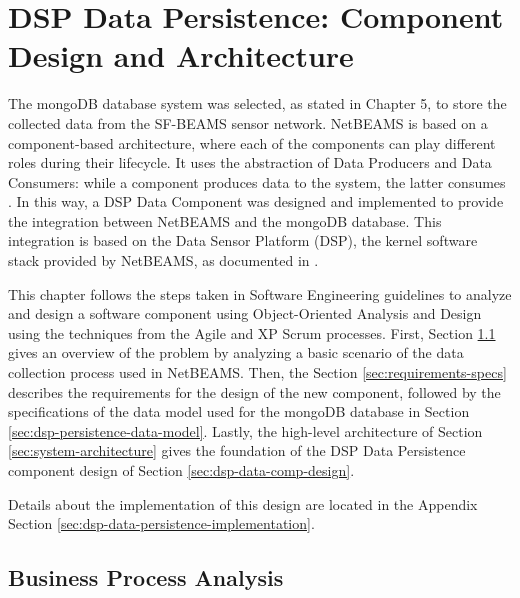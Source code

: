 

\chapter{DSP Data Persistence: Component Design and Architecture}

The mongoDB database system was selected, as stated in Chapter 5, to store 
the collected data from the SF-BEAMS sensor network. NetBEAMS is based on a 
component-based architecture, where each of the components can play different
roles during their lifecycle. It uses the abstraction of Data Producers and 
Data Consumers: while a component produces data to the system, the latter 
consumes \cite{netbeams2009}. In this way, a DSP Data Component was designed
and implemented to provide the integration between NetBEAMS and the mongoDB 
database. This integration is based on the Data Sensor Platform (DSP), the
kernel software stack provided by NetBEAMS, as documented in
\cite{netbeams-dsp-architecture}. 

This chapter follows the steps taken in Software Engineering guidelines to
analyze and design a software component using Object-Oriented Analysis and 
Design \cite{oop} using the techniques from the Agile and XP Scrum
\cite{agile-scrum} processes. First, Section \ref{sec:business-process-analysis} gives an
overview of the problem by analyzing a basic scenario of the data collection process used in NetBEAMS.
Then, the Section \ref{sec:requirements-specs} describes the requirements for
the design of the new component, followed by the specifications of the data
model used for the mongoDB database in Section
\ref{sec:dsp-persistence-data-model}. Lastly, the high-level architecture
of Section \ref{sec:system-architecture} gives the foundation of the
DSP Data Persistence component design of Section \ref{sec:dsp-data-comp-design}.

Details about the implementation of this design are located in the
Appendix Section \ref{sec:dsp-data-persistence-implementation}.

\section{Business Process Analysis}
\label{sec:business-process-analysis}

